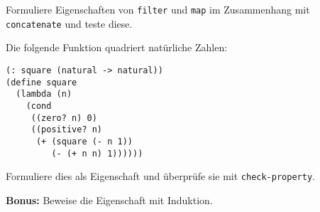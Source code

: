 \begin{aufgabe}
  Formuliere Eigenschaften von \lstinline{filter} und \lstinline{map}
  im Zusammenhang mit \lstinline{concatenate} und teste diese.
\end{aufgabe}

\begin{aufgabe}
Die folgende Funktion quadriert natürliche Zahlen:
%
\begin{lstlisting}
(: square (natural -> natural))
(define square
  (lambda (n)
    (cond
     ((zero? n) 0)
     ((positive? n)
      (+ (square (- n 1))
         (- (+ n n) 1))))))
\end{lstlisting}
%
Formuliere dies als Eigenschaft und überprüfe sie mit
\lstinline{check-property}.

\smallskip\noindent
\textbf{Bonus:} Beweise die Eigenschaft mit Induktion.
%
\end{aufgabe}


